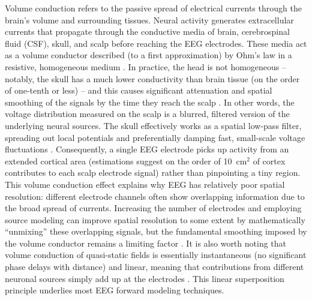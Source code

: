 \documentclass[final, a4paper,masters,en,listoffigures,listoftables,norwegiandates]{NMBU}
\begin{document}
Volume conduction refers to the passive spread of electrical currents through the brain’s volume and surrounding tissues. Neural activity generates extracellular currents that propagate through the conductive media of brain, cerebrospinal fluid (CSF), skull, and scalp before reaching the EEG electrodes. These media act as a volume conductor described (to a first approximation) by Ohm’s law in a resistive, homogeneous medium \cite{Halnes2024ElectricBrainSignals}. In practice, the head is not homogeneous – notably, the skull has a much lower conductivity than brain tissue (on the order of one-tenth or less) – and this causes significant attenuation and spatial smoothing of the signals by the time they reach the scalp \cite{Nunez2006}. In other words, the voltage distribution measured on the scalp is a blurred, filtered version of the underlying neural sources. The skull effectively works as a spatial low-pass filter, spreading out local potentials and preferentially damping fast, small-scale voltage fluctuations \cite{Buzsaki2012}. Consequently, a single EEG electrode picks up activity from an extended cortical area (estimations suggest on the order of 10~cm$^2$ of cortex contributes to each scalp electrode signal) rather than pinpointing a tiny region. This volume conduction effect explains why EEG has relatively poor spatial resolution: different electrode channels often show overlapping information due to the broad spread of currents. Increasing the number of electrodes and employing source modeling can improve spatial resolution to some extent by mathematically “unmixing” these overlapping signals, but the fundamental smoothing imposed by the volume conductor remains a limiting factor \cite{Buzsaki2012}. It is also worth noting that volume conduction of quasi-static fields is essentially instantaneous (no significant phase delays with distance) and linear, meaning that contributions from different neuronal sources simply add up at the electrodes \cite{Halnes2024ElectricBrainSignals}. This linear superposition principle underlies most EEG forward modeling techniques.
\end{document}
